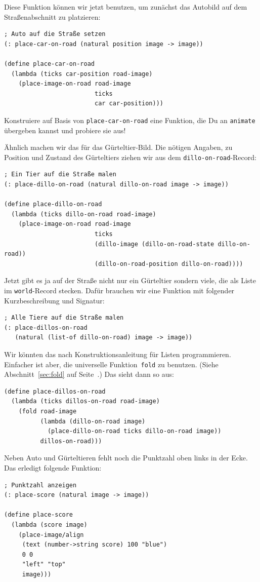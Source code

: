 Diese Funktion können wir jetzt benutzen, um zunächst das Autobild auf
dem Straßenabschnitt zu platzieren:
% 
\begin{lstlisting}
; Auto auf die Straße setzen
(: place-car-on-road (natural position image -> image))
                      
(define place-car-on-road
  (lambda (ticks car-position road-image)
    (place-image-on-road road-image
                         ticks
                         car car-position)))
\end{lstlisting}
%
\begin{aufgabeinline}
  Konstruiere auf Basis von \lstinline{place-car-on-road} eine
  Funktion, die Du an \lstinline{animate} übergeben kannst und
  probiere sie aus!
\end{aufgabeinline}
%
Ähnlich machen wir das für das Gürteltier-Bild.  Die nötigen Angaben,
zu Position und Zustand des Gürteltiers ziehen wir aus dem
\lstinline{dillo-on-road}-Record:
%
\begin{lstlisting}
; Ein Tier auf die Straße malen
(: place-dillo-on-road (natural dillo-on-road image -> image))

(define place-dillo-on-road
  (lambda (ticks dillo-on-road road-image)
    (place-image-on-road road-image
                         ticks
                         (dillo-image (dillo-on-road-state dillo-on-road))
                         (dillo-on-road-position dillo-on-road))))
\end{lstlisting}
%
Jetzt gibt es ja auf der Straße nicht nur ein Gürteltier sondern
viele, die als Liste im \lstinline{world}-Record stecken.  Dafür
brauchen wir eine Funktion mit folgender Kurzbeschreibung und
Signatur:
%
\begin{lstlisting}
; Alle Tiere auf die Straße malen
(: place-dillos-on-road
   (natural (list-of dillo-on-road) image -> image))
\end{lstlisting}
%
Wir könnten das nach Konstruktionsanleitung für Listen programmieren.
Einfacher ist aber, die universelle Funktion~\lstinline{fold} zu
benutzen. (Siehe Abschnitt~\ref{sec:fold} auf
Seite~\pageref{sec:fold}.)  Das sieht dann so aus:
%
\begin{lstlisting}
(define place-dillos-on-road
  (lambda (ticks dillos-on-road road-image)
    (fold road-image
          (lambda (dillo-on-road image)
            (place-dillo-on-road ticks dillo-on-road image))
          dillos-on-road)))
\end{lstlisting}
%
Neben Auto und Gürteltieren fehlt noch die Punktzahl oben links in der
Ecke.  Das erledigt folgende Funktion:
%
\begin{lstlisting}
; Punktzahl anzeigen
(: place-score (natural image -> image))

(define place-score
  (lambda (score image)
    (place-image/align
     (text (number->string score) 100 "blue")
     0 0
     "left" "top"
     image)))
\end{lstlisting}
%

